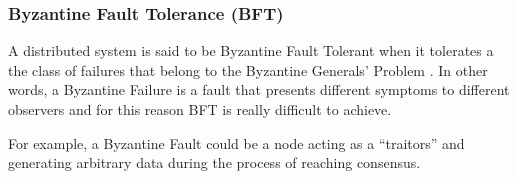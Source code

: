 \subsubsection{Byzantine Fault Tolerance (BFT)}
A distributed system is said to be Byzantine Fault Tolerant when it tolerates a
the class of failures that belong to the Byzantine Generals’ Problem \cite{byzantine-konstantopoulos}.
In other words, a Byzantine Failure is a fault that presents different symptoms
to different observers and for this reason BFT is really difficult to achieve.

For example, a Byzantine Fault could be a node acting as a ``traitors'' and
generating arbitrary data during the process of reaching consensus.
